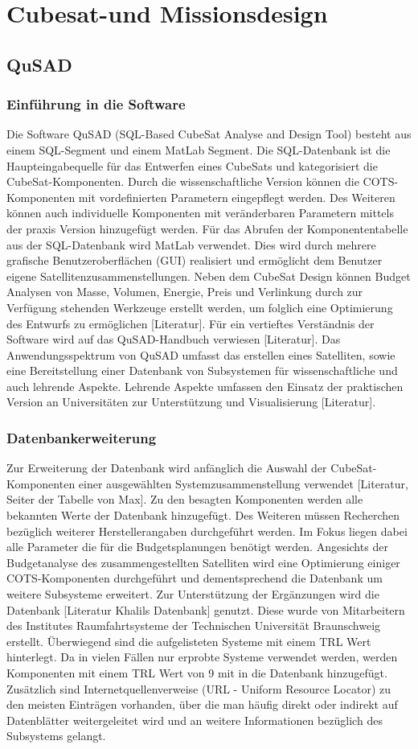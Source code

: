 \chapter{Cubesat-und Missionsdesign}
		\section{QuSAD}
			\subsection{Einführung in die Software}
Die Software QuSAD (SQL-Based CubeSat Analyse and Design Tool) besteht aus einem SQL-Segment und einem MatLab Segment. Die SQL-Datenbank ist die Haupteingabequelle für das Entwerfen eines CubeSats und kategorisiert die CubeSat-Komponenten. Durch die wissenschaftliche Version können die COTS-Komponenten mit vordefinierten Parametern eingepflegt werden. Des Weiteren können auch individuelle Komponenten mit veränderbaren Parametern mittels der praxis Version hinzugefügt werden. Für das Abrufen der Komponententabelle aus der SQL-Datenbank wird MatLab verwendet. Dies wird durch mehrere grafische Benutzeroberflächen (GUI) realisiert und ermöglicht dem Benutzer eigene Satellitenzusammenstellungen. Neben dem CubeSat Design können Budget Analysen von Masse, Volumen, Energie, Preis und Verlinkung durch zur Verfügung stehenden Werkzeuge erstellt werden, um folglich eine Optimierung des Entwurfs zu ermöglichen [Literatur]. Für ein vertieftes Verständnis der Software wird auf das QuSAD-Handbuch verwiesen [Literatur]. Das Anwendungsspektrum von QuSAD umfasst das erstellen eines Satelliten, sowie eine Bereitstellung einer Datenbank von Subsystemen für wissenschaftliche und auch lehrende Aspekte. Lehrende Aspekte umfassen den Einsatz der praktischen Version an Universitäten zur Unterstützung und Visualisierung [Literatur]. 
			\subsection{Datenbankerweiterung}
			Zur Erweiterung der Datenbank wird anfänglich die Auswahl der CubeSat-Komponenten einer ausgewählten Systemzusammenstellung verwendet [Literatur, Seiter der Tabelle von Max]. Zu den besagten Komponenten werden alle bekannten Werte der Datenbank hinzugefügt. Des Weiteren müssen Recherchen bezüglich weiterer Herstellerangaben durchgeführt werden. Im Fokus liegen dabei alle Parameter die für die Budgetsplanungen benötigt werden. Angesichts der Budgetanalyse des zusammengestellten Satelliten wird eine Optimierung einiger COTS-Komponenten durchgeführt und dementsprechend die Datenbank um weitere Subsysteme erweitert. Zur Unterstützung der Ergänzungen wird die Datenbank [Literatur Khalils Datenbank] genutzt. Diese wurde von Mitarbeitern des Institutes Raumfahrtsysteme der Technischen Universität Braunschweig erstellt. Überwiegend sind die aufgelisteten Systeme mit einem TRL Wert hinterlegt. Da in vielen Fällen nur erprobte Systeme verwendet werden, werden Komponenten mit einem TRL Wert von 9 mit in die Datenbank hinzugefügt. Zusätzlich sind Internetquellenverweise (URL - Uniform Resource Locator) zu den meisten Einträgen vorhanden, über die man häufig direkt oder indirekt auf Datenblätter weitergeleitet wird und an weitere Informationen bezüglich des Subsystems gelangt.
